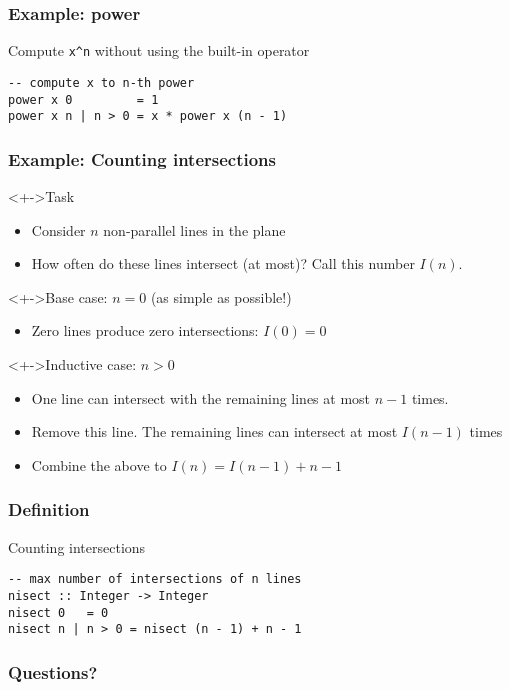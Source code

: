 \documentclass{beamer}
\begin{document}
\begin{frame}[fragile]
  \frametitle{Example: power}
  Compute \verb|x^n| without using the built-in operator
\begin{verbatim}
-- compute x to n-th power
power x 0         = 1
power x n | n > 0 = x * power x (n - 1)
\end{verbatim}
\end{frame}

\begin{frame}
  \frametitle{Example: Counting intersections}
  \begin{block}<+->{Task}
    \begin{itemize}
    \item Consider $n$ non-parallel lines in the plane
    \item How often do these lines intersect (at most)? Call this
      number $I (n)$.
    \end{itemize}
  \end{block}
  \begin{block}<+->{Base case: $n=0$ (as simple as possible!)}
    \begin{itemize}
    \item<+-> Zero lines produce zero intersections: $I(0) = 0$
    \end{itemize}
  \end{block}
  \begin{block}<+->{Inductive case: $n>0$}
    \begin{itemize}
    \item<+-> One line can intersect with the remaining
      lines at most $n-1$ times.
    \item<+-> Remove this line. The remaining lines can intersect at
      most $I (n-1)$ times
    \item<+-> Combine the above to $I (n) =  I (n-1) + n-1$
    \end{itemize}
  \end{block}
\end{frame}
\begin{frame}[fragile]
  \frametitle{Definition}
  \begin{block}{Counting intersections}
\begin{verbatim}
-- max number of intersections of n lines
nisect :: Integer -> Integer
nisect 0   = 0
nisect n | n > 0 = nisect (n - 1) + n - 1
\end{verbatim}
  \end{block}
\end{frame}

\begin{frame}
  \frametitle{Questions?}
  \begin{center}
  \end{center}
\end{frame}
\end{document}
